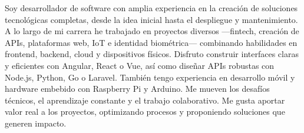 %
%
%
\par{
\begin{spacing}{1.20}Soy desarrollador de software con amplia experiencia en la creación de soluciones tecnológicas completas, desde la idea inicial hasta el despliegue y mantenimiento. A lo largo de mi carrera he trabajado en proyectos diversos —fintech, creación de APIs, plataformas web, IoT e identidad biométrica— combinando habilidades en frontend, backend, cloud y dispositivos físicos. Disfruto construir interfaces claras y eficientes con Angular, React o Vue, así como diseñar APIs robustas con Node.js, Python, Go o Laravel. También tengo experiencia en desarrollo móvil y hardware embebido con Raspberry Pi y Arduino. Me mueven los desafíos técnicos, el aprendizaje constante y el trabajo colaborativo. Me gusta aportar valor real a los proyectos, optimizando procesos y proponiendo soluciones que generen impacto.\end{spacing}
}